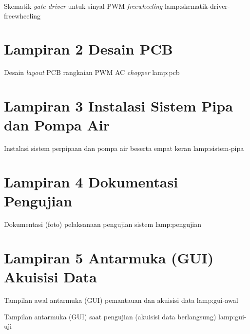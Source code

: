   {Skematik \emph{gate driver} untuk sinyal PWM \emph{freewheeling}}
  {lamp:skematik-driver-freewheeling}

\section*{Lampiran 2 \quad Desain PCB}

  {Desain \emph{layout} PCB rangkaian PWM AC \emph{chopper}}
  {lamp:pcb}

\section*{Lampiran 3 \quad Instalasi Sistem Pipa dan Pompa Air}

  {Instalasi sistem perpipaan dan pompa air beserta empat keran}
  {lamp:sistem-pipa}

\section*{Lampiran 4 \quad Dokumentasi Pengujian}

  {Dokumentasi (foto) pelaksanaan pengujian sistem}
  {lamp:pengujian}

\section*{Lampiran 5 \quad Antarmuka (GUI) Akuisisi Data}

  {Tampilan awal antarmuka (GUI) pemantauan dan akuisisi data}
  {lamp:gui-awal}

  {Tampilan antarmuka (GUI) saat pengujian (akuisisi data berlangsung)}
  {lamp:gui-uji}


